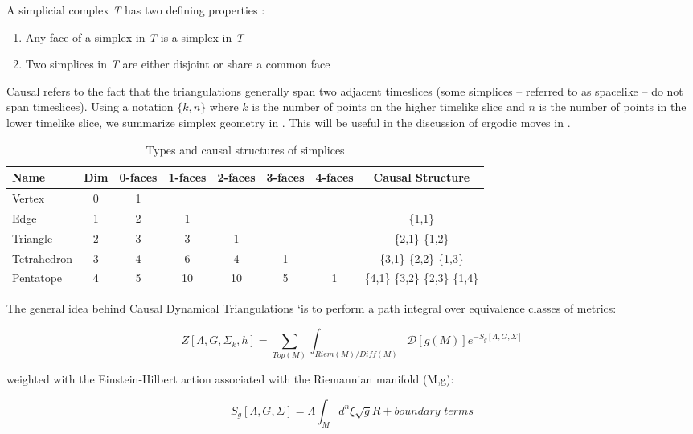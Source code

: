 \documentclass[12pt]{article}
\begin{document}
A simplicial complex \textit{T} has two defining properties \cite{cgal:eb-12b}:

\begin{enumerate}
  \item Any face of a simplex in \textit{T} is a simplex in \textit{T}
  \item Two simplices in \textit{T} are either disjoint or share a common face
\end{enumerate}

Causal refers to the fact that the triangulations generally span two adjacent timeslices (some simplices -- referred to as spacelike -- do not span timeslices). Using a notation $\{k,n\}$ where $k$ is the number of points on the higher timelike slice and $n$ is the number of points in the lower timelike slice, we summarize simplex geometry in . This will be useful in the discussion of ergodic moves in .

\begin{table}
\centering
\begin{tabular}{|l|c|c|c|c|c|c|c|}
\hline
Name & Dim & 0-faces & 1-faces & 2-faces & 3-faces & 4-faces & Causal Structure \\
\hline
\hline
Vertex & 0 & 1 & & & & & \\
Edge & 1 & 2 & 1 & & & & \{1,1\} \\
Triangle & 2 & 3 & 3 & 1 & & & \{2,1\} \{1,2\}\\
Tetrahedron & 3 & 4 & 6 & 4 & 1 & & \{3,1\} \{2,2\} \{1,3\} \\
Pentatope & 4 & 5 & 10 & 10 & 5 & 1 & \{4,1\} \{3,2\} \{2,3\} \{1,4\} \\
\hline
\end{tabular}
\caption[Simplex types]{Types and causal structures of simplices}
\label{table:simplices}
\end{table}

The general idea behind Causal Dynamical Triangulations `is to perform a path integral over equivalence classes of metrics:

\begin{equation}
  Z[\Lambda,G,\Sigma_k,h]=\sum_{Top(M)}\int_{Riem(M)/Diff(M)}\mathcal{D}[g(M)]e^{-S_g[\Lambda,G,\Sigma]}
\end{equation}

weighted with the Einstein-Hilbert action associated with the Riemannian manifold (M,g):

\begin{equation}
  S_g[\Lambda,G,\Sigma]=\Lambda\int_{M}d^n\xi\sqrt{g}R + \textit{boundary terms}
\end{equation}
\end{document}
